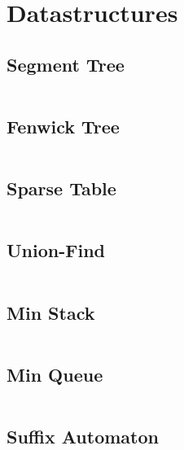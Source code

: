 \documentclass[11pt, a4paper]{amsart}
\begin{document}
	\newpage
	\section{Datastructures}
	\begin{multicols*}{2}		
		\subsection{Segment Tree}
		\inputminted[firstline=14,lastline=42]{c++}{.code/datastructures/segment_tree.cpp}
		\subsection{Fenwick Tree}
		\inputminted[firstline=14,lastline=28]{c++}{.code/datastructures/fenwick_tree.cpp}
		\subsection{Sparse Table}
		\inputminted[firstline=15,lastline=23]{c++}{.code/datastructures/sparse_table.cpp}
		\vfill\null
		\columnbreak
		\subsection{Union-Find}
		\inputminted[firstline=9,lastline=15]{c++}{.code/datastructures/union_find.cpp}
		\subsection{Min Stack}
		\inputminted[firstline=15,lastline=21]{c++}{.code/datastructures/min_queue.cpp}
		\subsection{Min Queue}
		\inputminted[firstline=23,lastline=30]{c++}{.code/datastructures/min_queue.cpp}
		\subsection{Suffix Automaton}
		\inputminted[firstline=16,lastline=43]{c++}{.code/strings/suffixAutomaton.cpp}
		\vfill\null
	\end{multicols*}
\end{document}
